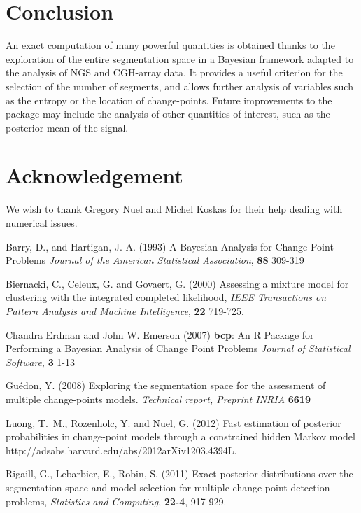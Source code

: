 \documentclass{bioinfo}
\begin{document}
\begin{methods}
\section{Conclusion}

An exact computation of many powerful quantities is obtained thanks to the exploration of the entire segmentation space in a Bayesian framework adapted to the analysis of NGS and CGH-array data.
It provides a useful criterion for the selection of the number of segments, and allows further analysis of variables such as the entropy or the location of change-points. 
Future improvements to the package may include the analysis of other quantities of interest, such as the posterior mean of the signal.



\section*{Acknowledgement}
We wish to thank Gregory Nuel and Michel Koskas for their help dealing with numerical issues.


%
%
%
%

%
%
%
%


\begin{thebibliography}{}

 Barry, D., and Hartigan, J. A. (1993) A Bayesian Analysis for Change Point Problems {\it Journal of the American Statistical Association}, {\bf 88} 309-319

 Biernacki, C., Celeux, G. and Govaert, G. (2000) Assessing a mixture model for clustering with the integrated completed likelihood, {\it{IEEE} Transactions on Pattern Analysis and Machine Intelligence}, {\bf 22} 719-725.

   Chandra Erdman and John W. Emerson (2007) {\bf{bcp}}: An {R} Package for Performing a Bayesian Analysis
      of Change Point Problems {\it Journal of Statistical Software}, {\bf 3} 1-13

 Guédon, Y. (2008) Exploring the segmentation space for the assessment of multiple change-points models. {\it Technical report, Preprint INRIA} {\bf 6619}

 Luong, T.~M., Rozenholc, Y. and Nuel, G. (2012) Fast estimation of posterior probabilities in change-point models through a constrained hidden Markov model {http://adsabs.harvard.edu/abs/2012arXiv1203.4394L}.

 Rigaill, G., Lebarbier, E., Robin, S. (2011) Exact posterior distributions over the segmentation space and model selection for multiple change-point detection problems, {\it Statistics and Computing}, {\bf 22-4}, 917-929.

\end{thebibliography}
\end{methods}
\end{document}
